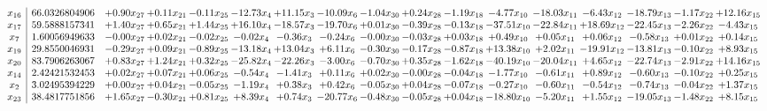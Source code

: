 \documentclass[9pt]{article}
\begin{document}
 \[\begin{array}{c| c c@{\hskip 2pt} c@{\hskip 2pt} c@{\hskip 2pt} c@{\hskip 2pt} c@{\hskip 2pt} c@{\hskip 2pt} c@{\hskip 2pt} c@{\hskip 2pt} c@{\hskip 2pt} c@{\hskip 2pt} c@{\hskip 2pt} c@{\hskip 2pt} c@{\hskip 2pt} c@{\hskip 2pt} c@{\hskip 2pt} }
 x_{16}   &  66.0326804906 & +  0.90 x_{27} & +  0.11 x_{21} & -0.11 x_{25} & -12.73 x_{4} & + 11.15 x_{3} & -10.09 x_{6} & -1.04 x_{30} & +  0.24 x_{28} & -1.19 x_{18} & -4.77 x_{10} & -18.03 x_{11} & -6.43 x_{12} & -18.79 x_{13} & -1.17 x_{22} & + 12.16 x_{15}\\
 x_{17}   &  59.5888157341 & +  1.40 x_{27} & +  0.65 x_{21} & +  1.44 x_{25} & + 16.10 x_{4} & -18.57 x_{3} & -19.70 x_{6} & +  0.01 x_{30} & -0.39 x_{28} & -0.13 x_{18} & -37.51 x_{10} & -22.84 x_{11} & + 18.69 x_{12} & -22.45 x_{13} & -2.26 x_{22} & -4.43 x_{15}\\
 x_{7}   &  1.60056949633 & -0.00 x_{27} & +  0.02 x_{21} & -0.02 x_{25} & -0.02 x_{4} & -0.36 x_{3} & -0.24 x_{6} & -0.00 x_{30} & -0.03 x_{28} & +  0.03 x_{18} & +  0.49 x_{10} & +  0.05 x_{11} & +  0.06 x_{12} & -0.58 x_{13} & +  0.01 x_{22} & +  0.14 x_{15}\\
 x_{19}   &  29.8550046931 & -0.29 x_{27} & +  0.09 x_{21} & -0.89 x_{25} & -13.18 x_{4} & + 13.04 x_{3} & +  6.11 x_{6} & -0.30 x_{30} & -0.17 x_{28} & -0.87 x_{18} & + 13.38 x_{10} & +  2.02 x_{11} & -19.91 x_{12} & -13.81 x_{13} & -0.10 x_{22} & +  8.93 x_{15}\\
 x_{20}   &  83.7906263067 & +  0.83 x_{27} & +  1.24 x_{21} & +  0.32 x_{25} & -25.82 x_{4} & -22.26 x_{3} & -3.00 x_{6} & -0.70 x_{30} & +  0.35 x_{28} & -1.62 x_{18} & -40.19 x_{10} & -20.04 x_{11} & +  4.65 x_{12} & -22.74 x_{13} & -2.91 x_{22} & + 14.16 x_{15}\\
 x_{14}   &  2.42421532453 & +  0.02 x_{27} & +  0.07 x_{21} & +  0.06 x_{25} & -0.54 x_{4} & -1.41 x_{3} & +  0.11 x_{6} & +  0.02 x_{30} & -0.00 x_{28} & -0.04 x_{18} & -1.77 x_{10} & -0.61 x_{11} & +  0.89 x_{12} & -0.60 x_{13} & -0.10 x_{22} & +  0.25 x_{15}\\
 x_{2}   &  3.02495394229 & +  0.00 x_{27} & +  0.04 x_{21} & -0.05 x_{25} & -1.19 x_{4} & +  0.38 x_{3} & +  0.42 x_{6} & -0.05 x_{30} & +  0.04 x_{28} & -0.07 x_{18} & -0.27 x_{10} & -0.60 x_{11} & -0.54 x_{12} & -0.74 x_{13} & -0.04 x_{22} & +  1.37 x_{15}\\
 x_{23}   &  38.4817751856 & +  1.65 x_{27} & -0.30 x_{21} & +  0.81 x_{25} & +  8.39 x_{4} & +  0.74 x_{3} & -20.77 x_{6} & -0.48 x_{30} & -0.05 x_{28} & +  0.04 x_{18} & -18.80 x_{10} & -5.20 x_{11} & +  1.55 x_{12} & -19.05 x_{13} & -1.48 x_{22} & +  8.15 x_{15}\\

\end{array}\]
\end{document}
